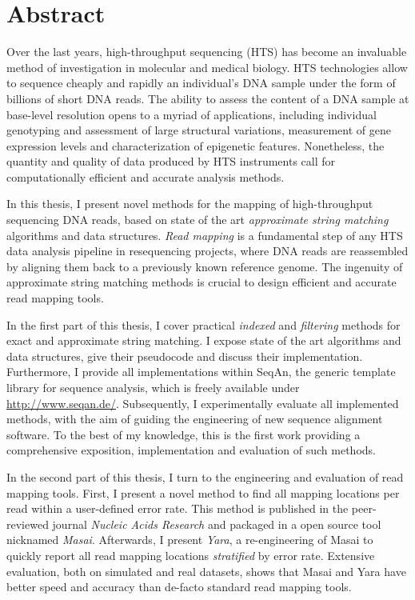 \section*{Abstract}
\label{sec:abstract:en}

Over the last years, high-throughput sequencing (HTS) has become an invaluable method of investigation in molecular  and medical biology.
HTS technologies allow to sequence cheaply and rapidly an individual's DNA sample under the form of billions of short DNA reads.
The ability to assess the content of a DNA sample at base-level resolution opens to a myriad of applications, including individual genotyping and assessment of large structural variations, measurement of gene expression levels and characterization of epigenetic features.
Nonetheless, the quantity and quality of data produced by HTS instruments call for computationally efficient and accurate analysis methods.

In this thesis, I present novel methods for the mapping of high-throughput sequencing DNA reads, based on state of the art \emph{approximate string matching} algorithms and data structures.
\emph{Read mapping} is a fundamental step of any HTS data analysis pipeline in resequencing projects, where DNA reads are reassembled by aligning them back to a previously known reference genome.
The ingenuity of approximate string matching methods is crucial to design efficient and accurate read mapping tools.

In the first part of this thesis, I cover practical \emph{indexed} and \emph{filtering} methods for exact and approximate string matching.
I expose state of the art algorithms and data structures, give their pseudocode and discuss their implementation.
Furthermore, I provide all implementations within SeqAn, the generic \CC template library for sequence analysis, which is freely available under \url{http://www.seqan.de/}.
Subsequently, I experimentally evaluate all implemented methods, with the aim of guiding the engineering of new sequence alignment software.
To the best of my knowledge, this is the first work providing a comprehensive exposition, implementation and evaluation of such methods.

In the second part of this thesis, I turn to the engineering and evaluation of read mapping tools.
First, I present a novel method to find all mapping locations per read within a user-defined error rate.
This method is published in the peer-reviewed journal \emph{Nucleic Acids Research} and packaged in a open source tool nicknamed \emph{Masai}.
Afterwards, I present \emph{Yara}, a re-engineering of Masai to quickly report all read mapping locations \emph{stratified} by error rate.
Extensive evaluation, both on simulated and real datasets, shows that Masai and Yara have better speed and accuracy than de-facto standard read mapping tools.


\newpage
